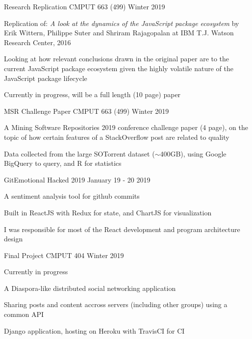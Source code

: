 
\begin{cventries}
  \cventry
    {}
    {Research Replication}
    {CMPUT 663 (499)}
    {Winter 2019}
    {
      \begin{cvitems}
      \item {Replication of: \textit{A look at the dynamics of the JavaScript package ecosystem} by Erik Wittern, Philippe Suter 
        and Shriram Rajagopalan at IBM T.J. Watson Research Center, 2016}
      \item {Looking at how relevant conclusions drawn in the original paper are to the current JavaScript package 
        ecosystem given the highly volatile nature of the JavaScript package lifecycle}
      \item {Currently in progress, will be a full length (10 page) paper}
      \end{cvitems}
    }

  \cventry
    {}
    {MSR Challenge Paper}
    {CMPUT 663 (499)}
    {Winter 2019}
    {
      \begin{cvitems} %
      \item {A Mining Software Repositories 2019 conference challenge paper (4 page), on the topic of how certain features of a 
        StackOverflow post are related to quality}
      \item {Data collected from the large SOTorrent dataset ($\sim$400GB), using Google BigQuery to query, and R for statistics}
      \end{cvitems}
    }

  \cventry
    {}
    {GitEmotional}
    {Hacked 2019}
    {January 19 - 20 2019}
    {
      \begin{cvitems}
      \item {A sentiment analysis tool for github commits}
      \item {Built in ReactJS with Redux for state, and ChartJS for visualization}
      \item {I was responsible for most of the React development and program architecture design}
      \end{cvitems}
    }

  \cventry
    {}
    {Final Project}
    {CMPUT 404}
    {Winter 2019}
    {
      \begin{cvitems}
      \item Currently in progress
      \item A Diaspora-like distributed social networking application
      \item Sharing posts and content accross servers (including other groups) using a common API 
      \item Django application, hosting on Heroku with TravisCI for CI
      \end{cvitems}
    }


\end{cventries}
